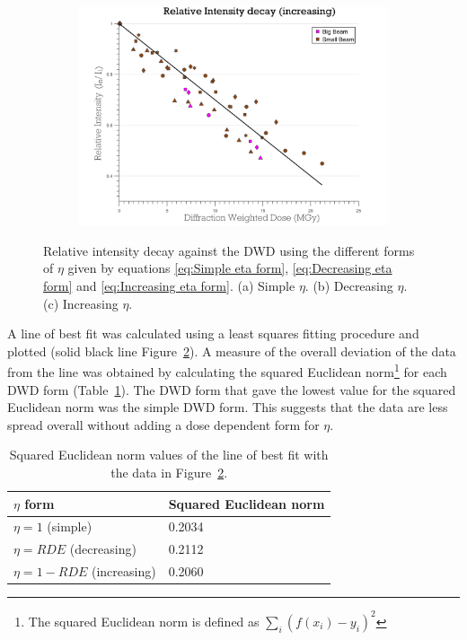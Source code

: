 \begin{figure}
\ContinuedFloat
    \begin{subfigure}[b]{1\textwidth}
        \centering
        \includegraphics[width=\textwidth]{figures/dwd/reproduce_relint_DWDnew.pdf}
        \caption{}
        \label{fig:Relative intensity - Decreasing Eta}
    \end{subfigure}
	\caption{Relative intensity decay against the DWD using the different forms of $\eta$ given by equations \ref{eq:Simple eta form}, \ref{eq:Decreasing eta form} and \ref{eq:Increasing eta form}.
    (a) Simple $\eta$.
    (b) Decreasing $\eta$.
    (c) Increasing $\eta$.}
	\label{fig:Relative intensity - DWD eta forms}
\end{figure}

A line of best fit was calculated using a least squares fitting procedure and plotted (solid black line Figure~\ref{fig:Relative intensity - DWD eta forms}).
A measure of the overall deviation of the data from the line was obtained by calculating the squared Euclidean norm\footnote{The squared Euclidean norm is defined as $\sum_i (f(x_i) - y_i)^2$} for each DWD form (Table~\ref{tab:Squared Euclidean norm values - Relative intensity fits}).
The DWD form that gave the lowest value for the squared Euclidean norm was the simple DWD form.
This suggests that the data are less spread overall without adding a dose dependent form for $\eta$.
\begin{table}[ht!]
\small
\captionsetup{justification=centering}
	\caption{Squared Euclidean norm values of the line of best fit with the data in Figure~\ref{fig:Relative intensity - DWD eta forms}.}
	\centering
	\begin{tabular}{p{5cm} p{4.5cm}}
		$\eta$ form			                & Squared Euclidean norm    \\
		\hline
		$\eta = 1$ (simple)     			& 0.2034        \\
		$\eta = RDE$ (decreasing)     	    & 0.2112        \\
		$\eta = 1-RDE$ (increasing)    		& 0.2060       \\
		\hline
	\end{tabular}
	\label{tab:Squared Euclidean norm values - Relative intensity fits}
\end{table}

